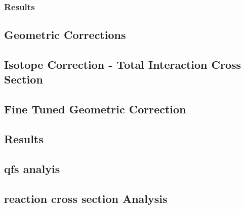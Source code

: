 \subsubsection{Results}



\subsection{Geometric Corrections}
\subsection{Isotope Correction - Total Interaction Cross Section}
\subsection{Fine Tuned Geometric Correction}
\subsection{Results}
\subsection{qfs analyis}
\subsection{reaction cross section Analysis}

